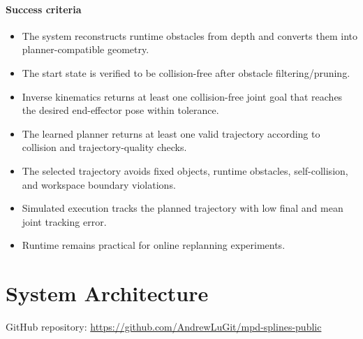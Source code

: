 \documentclass[11pt]{article}
\begin{document}
\paragraph{Success criteria}
\begin{itemize}
    \item The system reconstructs runtime obstacles from depth and converts them into planner-compatible geometry.
    \item The start state is verified to be collision-free after obstacle filtering/pruning.
    \item Inverse kinematics returns at least one collision-free joint goal that reaches the desired end-effector pose within tolerance.
    \item The learned planner returns at least one valid trajectory according to collision and trajectory-quality checks.
    \item The selected trajectory avoids fixed objects, runtime obstacles, self-collision, and workspace boundary violations.
    \item Simulated execution tracks the planned trajectory with low final and mean joint tracking error.
    \item Runtime remains practical for online replanning experiments.
\end{itemize}

\section{System Architecture}

GitHub repository: \url{https://github.com/AndrewLuGit/mpd-splines-public}
\end{document}
